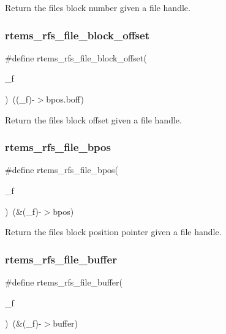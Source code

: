 Return the file\textquotesingle{}s block number given a file handle. \mbox{\label{rtems-rfs-file_8h_a205fd0f3d98c21f4b194ae800d1d567f}} 
\subsubsection{\texorpdfstring{rtems\_rfs\_file\_block\_offset}{rtems\_rfs\_file\_block\_offset}}
{\footnotesize\ttfamily \#define rtems\+\_\+rfs\+\_\+file\+\_\+block\+\_\+offset(\begin{DoxyParamCaption}\item[{}]{\+\_\+f }\end{DoxyParamCaption})~((\+\_\+f)-\/$>$bpos.\+boff)}

Return the file\textquotesingle{}s block offset given a file handle. \mbox{\label{rtems-rfs-file_8h_a21b9de6a6c7437246e73260be684ee87}} 
\subsubsection{\texorpdfstring{rtems\_rfs\_file\_bpos}{rtems\_rfs\_file\_bpos}}
{\footnotesize\ttfamily \#define rtems\+\_\+rfs\+\_\+file\+\_\+bpos(\begin{DoxyParamCaption}\item[{}]{\+\_\+f }\end{DoxyParamCaption})~(\&(\+\_\+f)-\/$>$bpos)}

Return the file\textquotesingle{}s block position pointer given a file handle. \mbox{\label{rtems-rfs-file_8h_a4586d565182d3860f29655d8d1c2a218}} 
\subsubsection{\texorpdfstring{rtems\_rfs\_file\_buffer}{rtems\_rfs\_file\_buffer}}
{\footnotesize\ttfamily \#define rtems\+\_\+rfs\+\_\+file\+\_\+buffer(\begin{DoxyParamCaption}\item[{}]{\+\_\+f }\end{DoxyParamCaption})~(\&(\+\_\+f)-\/$>$buffer)}

